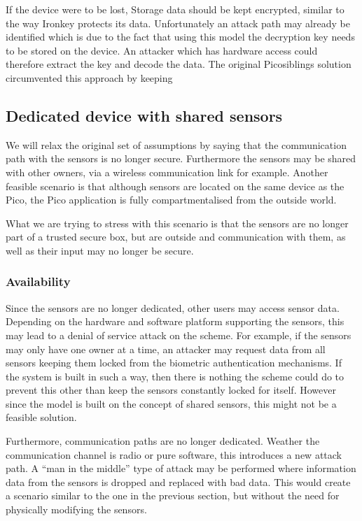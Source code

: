 	If the device were to be lost, 
	Storage data should be kept encrypted, similar to the way Ironkey \cite{} protects its data. Unfortunately an attack path may already be identified which is due to the fact that using this model the decryption key needs to be stored on the device. An attacker which has hardware access could therefore extract the key and decode the data. The original Picosiblings solution circumvented this approach by keeping 

\subsection{Dedicated device with shared sensors}
We will relax the original set of assumptions by saying that the communication path with the sensors is no longer secure. Furthermore the sensors may be shared with other owners, via a wireless communication link for example. Another feasible scenario is that although sensors are located on the same device as the Pico, the Pico application is fully compartmentalised from the outside world. 

What we are trying to stress with this scenario is that the sensors are no longer part of a trusted secure box, but are outside and communication with them, as well as their input may no longer be secure.

	\subsubsection*{Availability}
	Since the sensors are no longer dedicated, other users may access sensor data. Depending on the hardware and software platform supporting the sensors, this may lead to a denial of service attack on the scheme. For example, if the sensors may only have one owner at a time, an attacker may request data from all sensors keeping them locked from the biometric authentication mechanisms. If the system is built in such a way, then there is nothing the scheme could do to prevent this other than keep the sensors constantly locked for itself. However since the model is built on the concept of shared sensors, this might not be a feasible solution.
	
	Furthermore, communication paths are no longer dedicated. Weather the communication channel is radio or pure software, this introduces a new attack path. A ``man in the middle'' type of attack may be performed where information data from the sensors is dropped and replaced with bad data. This would create a scenario similar to the one in the previous section, but without the need for physically modifying the sensors.
	
